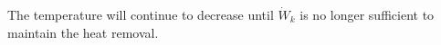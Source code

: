 The temperature will continue to decrease until \( \dot{W}_k \) is no longer sufficient to maintain the heat removal.